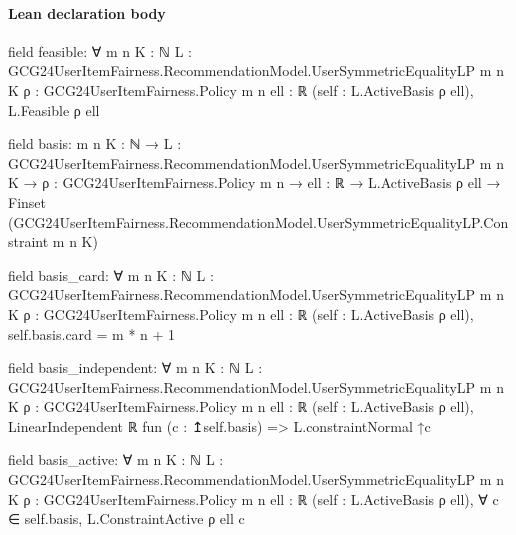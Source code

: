 \documentclass[10pt]{article}
\begin{document}
\paragraph{Lean declaration body}
\begin{ReviewVerbatim}
field feasible:
∀ {m n K : ℕ} {L : GCG24UserItemFairness.RecommendationModel.UserSymmetricEqualityLP m n K}
  {ρ : GCG24UserItemFairness.Policy m n} {ell : ℝ} (self : L.ActiveBasis ρ ell), L.Feasible ρ ell

field basis:
{m n K : ℕ} →
  {L : GCG24UserItemFairness.RecommendationModel.UserSymmetricEqualityLP m n K} →
    {ρ : GCG24UserItemFairness.Policy m n} →
      {ell : ℝ} →
        L.ActiveBasis ρ ell →
          Finset (GCG24UserItemFairness.RecommendationModel.UserSymmetricEqualityLP.Constraint m n K)

field basis_card:
∀ {m n K : ℕ} {L : GCG24UserItemFairness.RecommendationModel.UserSymmetricEqualityLP m n K}
  {ρ : GCG24UserItemFairness.Policy m n} {ell : ℝ} (self : L.ActiveBasis ρ ell), self.basis.card = m * n + 1

field basis_independent:
∀ {m n K : ℕ} {L : GCG24UserItemFairness.RecommendationModel.UserSymmetricEqualityLP m n K}
  {ρ : GCG24UserItemFairness.Policy m n} {ell : ℝ} (self : L.ActiveBasis ρ ell),
  LinearIndependent ℝ fun (c : ↥self.basis) => L.constraintNormal ↑c

field basis_active:
∀ {m n K : ℕ} {L : GCG24UserItemFairness.RecommendationModel.UserSymmetricEqualityLP m n K}
  {ρ : GCG24UserItemFairness.Policy m n} {ell : ℝ} (self : L.ActiveBasis ρ ell),
  ∀ c ∈ self.basis, L.ConstraintActive ρ ell c
\end{ReviewVerbatim}
\end{document}
